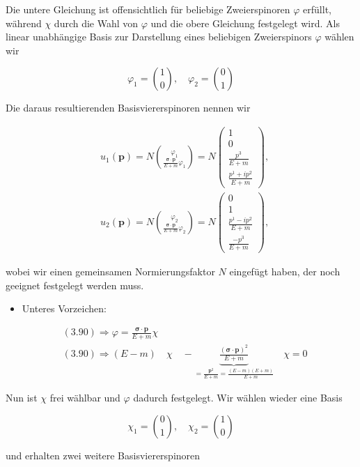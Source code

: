 \documentclass[10pt, letterpaper]{article}
\begin{document}
Die untere Gleichung ist offensichtlich für beliebige Zweierspinoren $\varphi$ erfüllt, während $\chi$ durch die Wahl von $\varphi$ und die obere Gleichung festgelegt wird. Als linear unabhängige Basis zur Darstellung eines beliebigen Zweierspinors $\varphi$ wählen wir

$$
\varphi_{1}=\binom{1}{0}, \quad \varphi_{2}=\binom{0}{1}
$$

Die daraus resultierenden Basisviererspinoren nennen wir

$$
\begin{aligned}
& u_{1}(\mathbf{p})=N\binom{\varphi_{1}}{\frac{\boldsymbol{\sigma} \cdot \mathbf{p}}{E+m} \varphi_{1}}=N\left(\begin{array}{c}
1 \\
0 \\
\frac{p^{3}}{E+m} \\
\frac{p^{1}+i p^{2}}{E+m}
\end{array}\right), \\
& u_{2}(\mathbf{p})=N\binom{\varphi_{2}}{\frac{\boldsymbol{\sigma} \cdot \mathbf{p}}{E+m} \varphi_{2}}=N\left(\begin{array}{c}
0 \\
1 \\
\frac{p^{1}-i p^{2}}{E+m} \\
\frac{-p^{3}}{E+m}
\end{array}\right),
\end{aligned}
$$

wobei wir einen gemeinsamen Normierungsfaktor $N$ eingefügt haben, der noch geeignet festgelegt werden muss.

\begin{itemize}
  \item Unteres Vorzeichen:
\end{itemize}

$$
\begin{aligned}
& (3.90) \Rightarrow \varphi=\frac{\boldsymbol{\sigma} \cdot \mathbf{p}}{E+m} \chi \\
& (3.90) \Rightarrow(E-m) \quad \chi \quad-\underbrace{\frac{(\boldsymbol{\sigma} \cdot \mathbf{p})^{2}}{E+m}}_{=\frac{\mathbf{p}^{2}}{E+m}=\frac{(E-m)(E+m)}{E+m}} \quad \chi=0
\end{aligned}
$$

Nun ist $\chi$ frei wählbar und $\varphi$ dadurch festgelegt. Wir wählen wieder eine Basis

$$
\chi_{1}=\binom{0}{1}, \quad \chi_{2}=\binom{1}{0}
$$

und erhalten zwei weitere Basisviererspinoren
\end{document}
